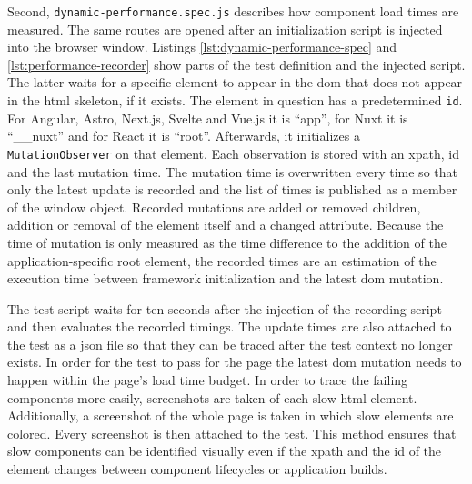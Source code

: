 \documentclass[a4paper, 12pt]{article}
\begin{document}
Second, \verb|dynamic-performance.spec.js| describes how component load times are measured.
The same routes are opened after an initialization script is injected into the browser window.
Listings \ref{lst:dynamic-performance-spec} and \ref{lst:performance-recorder} show parts of the test definition and the injected script.
The latter waits for a specific element to appear in the \acrshort{dom} that does not appear in the \acrshort{html} skeleton, if it exists.
The element in question has a predetermined \verb|id|.
For Angular, Astro, Next.js, Svelte and Vue.js it is \enquote{app}, for Nuxt it is \enquote{\_\_nuxt} and for React it is \enquote{root}.
Afterwards, it initializes a \verb|MutationObserver| on that element.
Each observation is stored with an xpath, id and the last mutation time.
The mutation time is overwritten every time so that only the latest update is recorded and the list of times is published as a member of the window object.
Recorded mutations are added or removed children, addition or removal of the element itself and a changed attribute.
Because the time of mutation is only measured as the time difference to the addition of the application-specific root element, the recorded times are an estimation of the execution time between framework initialization and the latest \acrshort{dom} mutation.

The test script waits for ten seconds after the injection of the recording script and then evaluates the recorded timings.
The update times are also attached to the test as a \acrshort{json} file so that they can be traced after the test context no longer exists.
In order for the test to pass for the page the latest \acrshort{dom} mutation needs to happen within the page's load time budget.
In order to trace the failing components more easily, screenshots are taken of each slow \acrshort{html} element.
Additionally, a screenshot of the whole page is taken in which slow elements are colored. Every screenshot is then attached to the test.
This method ensures that slow components can be identified visually even if the xpath and the id of the element changes between component lifecycles or application builds.
\end{document}
